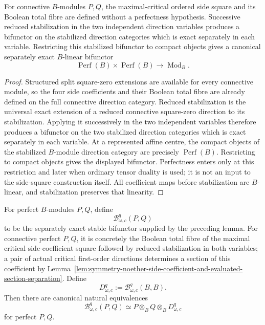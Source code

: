 \begin{lemma}
\label{lem:symmetry-noether-stable-extension-of-the-exact-critical-side-coefficient}
For connective $B$-modules $P,Q$, the maximal-critical ordered side square and its
Boolean total fibre are defined without a perfectness hypothesis.  Successive
reduced stabilization in the two independent direction variables produces a
bifunctor on the stabilized direction categories which is exact separately in each
variable.  Restricting this stabilized bifunctor to compact objects gives a
canonical separately exact $B$-linear bifunctor
\[
\operatorname{Perf}(B)\times\operatorname{Perf}(B)
\longrightarrow
\operatorname{Mod}_B.
\]
\end{lemma}

\begin{proof}
Structured split square-zero extensions are available for every connective module,
so the four side coefficients and their Boolean total fibre are already defined on
the full connective direction category.  Reduced stabilization is the universal
exact extension of a reduced connective square-zero direction to its stabilization.
Applying it successively in the two independent variables therefore produces a
bifunctor on the two stabilized direction categories which is exact separately in
each variable.  At a represented affine centre, the compact objects of the
stabilized $B$-module direction category are precisely $\operatorname{Perf}(B)$.
Restricting to compact objects gives the displayed bifunctor.  Perfectness enters
only at this restriction and later when ordinary tensor duality is used; it is not
an input to the side-square construction itself.  All coefficient maps before
stabilization are $B$-linear, and stabilization preserves that linearity.
\end{proof}

\begin{construction}
\label{constr:symmetry-noether-exact-bilinear-critical-presymplectic-coefficient}
For perfect $B$-modules $P,Q$, define
\[
\boxed{
\mathscr B_{\omega,c}^{q}(P,Q)
}
\]
to be the separately exact stable bifunctor supplied by the preceding lemma.  For
connective perfect $P,Q$, it is concretely the Boolean total fibre of the maximal
critical side-coefficient square followed by reduced stabilization in both
variables; a pair of actual critical first-order directions determines a section
of this coefficient by
Lemma~\ref{lem:symmetry-noether-side-coefficient-and-evaluated-section-separation}.
Define
\[
D_{\omega,c}^{q}
:=
\mathscr B_{\omega,c}^{q}(B,B).
\]
Then there are canonical natural equivalences
\[
\boxed{
\mathscr B_{\omega,c}^{q}(P,Q)
\simeq
P\otimes_BQ\otimes_BD_{\omega,c}^{q}
}
\]
for perfect $P,Q$.
\end{construction}

